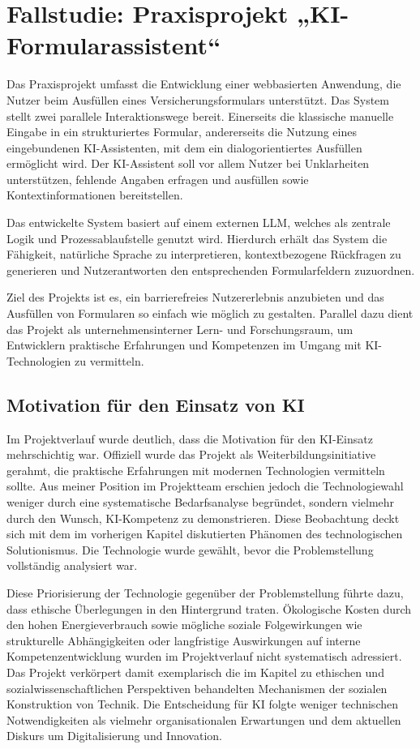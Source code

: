 \chapter{Fallstudie: Praxisprojekt „KI-Formularassistent“}
\label{chap:fallstudie}

Das Praxisprojekt umfasst die Entwicklung einer webbasierten Anwendung, die Nutzer beim Ausfüllen eines Versicherungsformulars unterstützt. Das System stellt zwei parallele Interaktionswege bereit. Einerseits die klassische manuelle Eingabe in ein strukturiertes Formular, andererseits die Nutzung eines eingebundenen KI-Assistenten, mit dem ein dialogorientiertes Ausfüllen ermöglicht wird. Der KI-Assistent soll vor allem Nutzer bei Unklarheiten unterstützen, fehlende Angaben erfragen und ausfüllen sowie Kontextinformationen bereitstellen.

Das entwickelte System basiert auf einem externen LLM, welches als zentrale Logik und Prozessablaufstelle genutzt wird. Hierdurch erhält das System die Fähigkeit, natürliche Sprache zu interpretieren, kontextbezogene Rückfragen zu generieren und Nutzerantworten den entsprechenden Formularfeldern zuzuordnen.

Ziel des Projekts ist es, ein barrierefreies Nutzererlebnis anzubieten und das Ausfüllen von Formularen so einfach wie möglich zu gestalten. Parallel dazu dient das Projekt als unternehmensinterner Lern- und Forschungsraum, um Entwicklern praktische Erfahrungen und Kompetenzen im Umgang mit KI-Technologien zu vermitteln.

\section{Motivation für den Einsatz von KI}

Im Projektverlauf wurde deutlich, dass die Motivation für den KI-Einsatz mehrschichtig war. Offiziell wurde das Projekt als Weiterbildungsinitiative gerahmt, die praktische Erfahrungen mit modernen Technologien vermitteln 
sollte. Aus meiner Position im Projektteam erschien jedoch die Technologiewahl weniger durch eine systematische Bedarfsanalyse begründet, sondern vielmehr durch den Wunsch, KI-Kompetenz zu demonstrieren. Diese Beobachtung deckt 
sich mit dem im vorherigen Kapitel diskutierten Phänomen des technologischen Solutionismus. Die Technologie wurde gewählt, bevor die Problemstellung vollständig analysiert war.

Diese Priorisierung der Technologie gegenüber der Problemstellung führte dazu, dass ethische Überlegungen in den Hintergrund traten. Ökologische Kosten durch den hohen Energieverbrauch sowie mögliche soziale Folgewirkungen wie strukturelle Abhängigkeiten oder langfristige Auswirkungen auf interne Kompetenzentwicklung wurden im Projektverlauf nicht systematisch adressiert. Das Projekt verkörpert damit exemplarisch die im Kapitel zu ethischen und sozialwissenschaftlichen Perspektiven behandelten Mechanismen der sozialen Konstruktion von Technik. Die Entscheidung für KI folgte weniger technischen Notwendigkeiten als vielmehr organisationalen Erwartungen und dem aktuellen Diskurs um Digitalisierung und Innovation.

